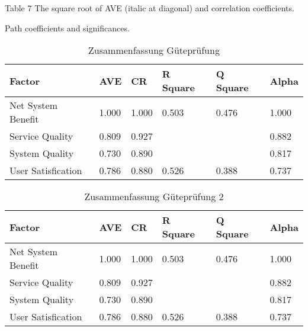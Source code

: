 Table 7
The square root of AVE (italic at diagonal) and correlation coefficients.

Path coefficients and significances.












\begin{table}[h] 
\caption{Zusammenfassung G\"utepr\"ufung}
\label{tab:Zusammenfassung} 
\begin{tabular}{|l|l|l|l|l|l|}
  \hline
\textbf{Factor} & \textbf{AVE} & \textbf{CR} & \textbf{R Square} & \textbf{Q Square} & \textbf{Alpha} \\
  \hline
 Net System Benefit & 1.000 & 1.000 & 0.503 & 0.476 & 1.000 \\
  \hline 
 Service Quality & 0.809 & 0.927 & & & 0.882 \\
  \hline
 System Quality & 0.730 & 0.890 & & & 0.817 \\
  \hline
 User Satisfication & 0.786 & 0.880 & 0.526 & 0.388 & 0.737 \\ 
 \hline
\end{tabular}	
\end{table}


\begin{table}[h] 
\caption{Zusammenfassung G\"utepr\"ufung 2}
\label{tab:Zusammenfassung} 
\begin{tabular}{@{}llllll@{}} \toprule

\textbf{Factor} & \textbf{AVE} & \textbf{CR} & \textbf{R Square} & \textbf{Q Square} & \textbf{Alpha} \\ \midrule

 Net System Benefit & 1.000 & 1.000 & 0.503 & 0.476 & 1.000 \\
 
 Service Quality & 0.809 & 0.927 & & & 0.882 \\

 System Quality & 0.730 & 0.890 & & & 0.817 \\

 User Satisfication & 0.786 & 0.880 & 0.526 & 0.388 & 0.737 \\ \bottomrule
\end{tabular}	
\end{table}